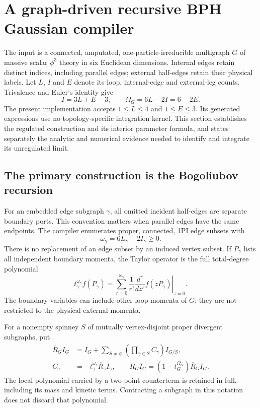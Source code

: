 \section{A graph-driven recursive BPH Gaussian compiler}
\label{sec:automatic-compiler}

The input is a connected, amputated, one-particle-irreducible multigraph
$G$ of massive scalar $\phi^3$ theory in six Euclidean dimensions.
Internal edges retain distinct indices, including parallel edges; external
half-edges retain their physical labels.  Let $L$, $I$ and $E$ denote its
loop, internal-edge and external-leg counts.  Trivalence and Euler's
identity give
\[
 I=3L+E-3,\qquad \Omega_G=6L-2I=6-2E.
\]
The present implementation accepts $1\le L\le4$ and $1\le E\le3$.
Its generated expressions use no topology-specific integration kernel.
This section establishes the regulated construction and its interior
parameter formula, and states separately the analytic and numerical
evidence needed to identify and integrate its unregulated limit.

\subsection{The primary construction is the Bogoliubov recursion}

For an embedded edge subgraph $\gamma$, all omitted incident half-edges
are separate boundary ports.  This convention matters when parallel
edges have the same endpoints.  The compiler enumerates proper,
connected, 1PI edge subsets with
\[
 \omega_\gamma=6L_\gamma-2I_\gamma\ge0.
\]
There is no replacement of an edge subset by an induced vertex subset.
If $P_\gamma$ lists all independent boundary momenta, the Taylor operator
is the full total-degree polynomial
\[
 t_\gamma^{\omega_\gamma} f(P_\gamma)
 =\sum_{r=0}^{\omega_\gamma}\frac1{r!}
   \left.\frac{d^r}{dz^r}f(zP_\gamma)\right|_{z=0}.
\]
The boundary variables can include other loop momenta of $G$; they are
not restricted to the physical external momenta.

For a nonempty spinney $S$ of mutually vertex-disjoint proper divergent
subgraphs, put
\begin{align*}
 \overline R_G I_G
 &=I_G+\sum_{S\ne\varnothing}
       \left(\prod_{\gamma\in S} C_\gamma\right)I_{G/S},\\
 C_\gamma&=-t_\gamma^{\omega_\gamma}\overline R_\gamma I_\gamma,
 \qquad
 R_G I_G=(1-t_G^{\Omega_G})\overline R_G I_G.
\end{align*}
The local polynomial carried by a two-point counterterm is retained in
full, including its mass and kinetic terms.  Contracting a subgraph in
this notation does not discard that polynomial.


